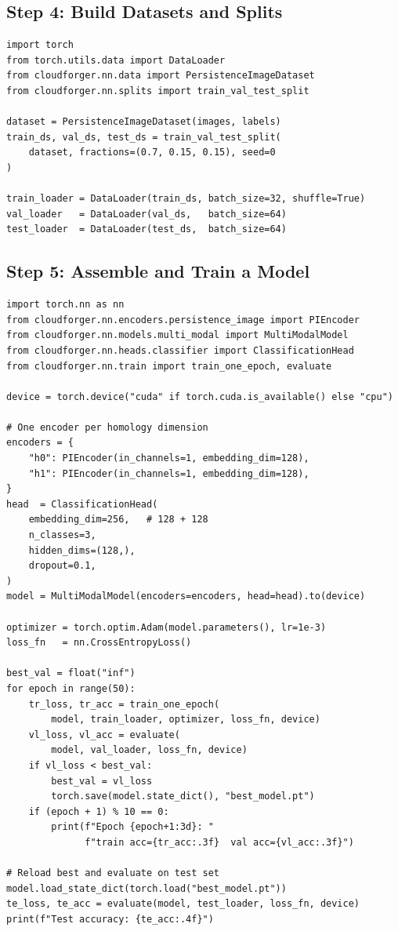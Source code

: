 \documentclass[11pt, a4paper]{article}
\begin{document}
\subsection{Step 4: Build Datasets and Splits}

\begin{lstlisting}
import torch
from torch.utils.data import DataLoader
from cloudforger.nn.data import PersistenceImageDataset
from cloudforger.nn.splits import train_val_test_split

dataset = PersistenceImageDataset(images, labels)
train_ds, val_ds, test_ds = train_val_test_split(
    dataset, fractions=(0.7, 0.15, 0.15), seed=0
)

train_loader = DataLoader(train_ds, batch_size=32, shuffle=True)
val_loader   = DataLoader(val_ds,   batch_size=64)
test_loader  = DataLoader(test_ds,  batch_size=64)
\end{lstlisting}

\subsection{Step 5: Assemble and Train a Model}

\begin{lstlisting}
import torch.nn as nn
from cloudforger.nn.encoders.persistence_image import PIEncoder
from cloudforger.nn.models.multi_modal import MultiModalModel
from cloudforger.nn.heads.classifier import ClassificationHead
from cloudforger.nn.train import train_one_epoch, evaluate

device = torch.device("cuda" if torch.cuda.is_available() else "cpu")

# One encoder per homology dimension
encoders = {
    "h0": PIEncoder(in_channels=1, embedding_dim=128),
    "h1": PIEncoder(in_channels=1, embedding_dim=128),
}
head  = ClassificationHead(
    embedding_dim=256,   # 128 + 128
    n_classes=3,
    hidden_dims=(128,),
    dropout=0.1,
)
model = MultiModalModel(encoders=encoders, head=head).to(device)

optimizer = torch.optim.Adam(model.parameters(), lr=1e-3)
loss_fn   = nn.CrossEntropyLoss()

best_val = float("inf")
for epoch in range(50):
    tr_loss, tr_acc = train_one_epoch(
        model, train_loader, optimizer, loss_fn, device)
    vl_loss, vl_acc = evaluate(
        model, val_loader, loss_fn, device)
    if vl_loss < best_val:
        best_val = vl_loss
        torch.save(model.state_dict(), "best_model.pt")
    if (epoch + 1) % 10 == 0:
        print(f"Epoch {epoch+1:3d}: "
              f"train acc={tr_acc:.3f}  val acc={vl_acc:.3f}")

# Reload best and evaluate on test set
model.load_state_dict(torch.load("best_model.pt"))
te_loss, te_acc = evaluate(model, test_loader, loss_fn, device)
print(f"Test accuracy: {te_acc:.4f}")
\end{lstlisting}
\end{document}
